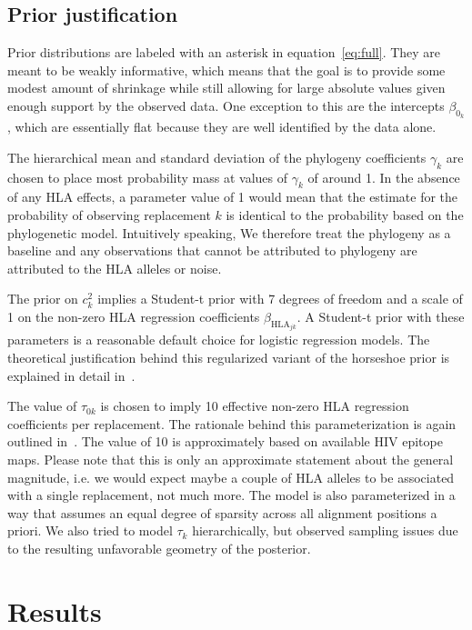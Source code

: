 \documentclass[fleqn,11pt]{SelfArx} %
\begin{document}
\subsection*{Prior justification}

Prior distributions are labeled with an asterisk in equation~\ref{eq:full}. They are meant to be weakly informative, which means that the goal is to provide some modest amount of shrinkage while still allowing for large absolute values given enough support by the observed data. One exception to this are the intercepts \(\beta_{0_k}\), which are essentially flat because they are well identified by the data alone.

The hierarchical mean and standard deviation of the phylogeny coefficients \(\gamma_{k}\) are chosen to place most probability mass at values of \(\gamma_{k}\) of around 1. In the absence of any HLA effects, a parameter value of 1 would mean that the estimate for the probability of observing replacement \(k\) is identical to the probability based on the phylogenetic model. Intuitively speaking, We therefore treat the phylogeny as a baseline and any observations that cannot be attributed to phylogeny are attributed to the HLA alleles or noise.

The prior on \(c_{k}^{2}\) implies a Student-t prior with 7 degrees of freedom and a scale of 1 on the non-zero HLA regression coefficients \(\beta_{\text{HLA}_{jk}}\). A Student-t prior with these parameters is a reasonable default choice for logistic regression models. The theoretical justification behind this regularized variant of the horseshoe prior is explained in detail in~\cite{Piironen2017}.

The value of \(\tau_{0k}\) is chosen to imply 10 effective non-zero HLA regression coefficients per replacement. The rationale behind this parameterization is again outlined in~\cite{Piironen2017}. The value of 10 is approximately based on available HIV epitope maps. Please note that this is only an approximate statement about the general magnitude, i.e. we would expect maybe a couple of HLA alleles to be associated with a single replacement, not much more.
The model is also parameterized in a way that assumes an equal degree of sparsity across all alignment positions a priori. We also tried to model \(\tau_k\) hierarchically, but observed sampling issues due to the resulting unfavorable geometry of the posterior.

\section{Results} \label{sec:results}
\end{document}
